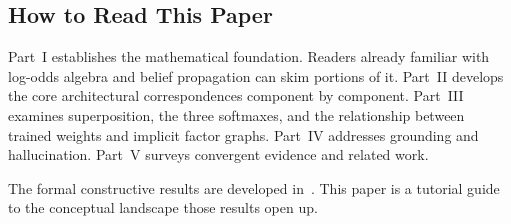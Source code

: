 \subsection*{How to Read This Paper}

Part~I establishes the mathematical foundation. Readers already
familiar with log-odds algebra and belief propagation can skim
portions of it. Part~II develops the core architectural
correspondences component by component. Part~III examines
superposition, the three softmaxes, and the relationship between
trained weights and implicit factor graphs. Part~IV addresses
grounding and hallucination. Part~V surveys convergent evidence and
related work.

The formal constructive results are developed
in~\cite{coppola2026transformers}. This paper is a tutorial guide to
the conceptual landscape those results open up.